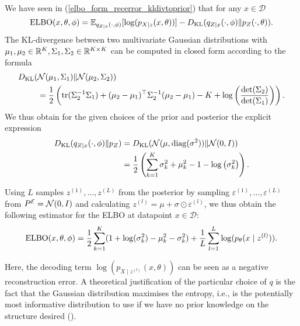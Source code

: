 We have seen in (\ref{elbo_form_recerror_kldivtoprior}) that for any $x \in \mathcal{D}$
$$
	\elbo(x,\theta, \phi) = \E_{q_{Z\mid x}(\cdot, \phi)}[\log(p_{X\mid z}(x,\theta))] - \dkl(q_{Z\mid x}(\cdot, \phi) \Vert p_{Z}(\cdot,\theta)).
$$
The KL-divergence between two multivariate Gaussian distributions with $\mu_1,\mu_2 \in \R^K, \Sigma_1, \Sigma_2 \in \R^{K\times K}$ can be computed in closed form according to the formula
\begin{equation}\label{formula_explicit_KL}
\begin{split}
	\dkl(&\mathcal{N}(\mu_1,\Sigma_1)\Vert \mathcal{N}(\mu_2,\Sigma_2)) \\
	&= \frac{1}{2} \left(\mathrm{tr}(\Sigma_2^{-1}\Sigma_1) 
	+ (\mu_2 - \mu_1)^{\top}\Sigma_2^{-1}(\mu_2 - \mu_1) 
	- K 
	+ \log\left(\frac{\det(\Sigma_2)}{\det(\Sigma_1)}\right)\right).
\end{split}
\end{equation}
We thus obtain for the given choices of the prior and posterior the explicit expression
\begin{equation}
\begin{split}
	\dkl(q_{Z\mid x}(\cdot, \phi) \Vert p_Z)
	&= \dkl(\mathcal{N}(\mu,\mathrm{diag}(\sigma^2))\Vert \mathcal{N}(0,I)) \\
	&= \frac{1}{2}\left(\sum_{k=1}^K \sigma_k^2 + \mu_k^2 - 1 - \log\left(\sigma_k^2\right)\right).
\end{split}
\end{equation}

Using $L$ samples $z^{(1)}, \dots, z^{(L)}$ from the posterior by sampling $\varepsilon^{(1)}, \dots, \varepsilon^{(L)}$ from $\P^{\mathcal{E}} = \mathcal{N}(0,I)$ and calculating $z^{(l)} = \mu + \sigma \odot \varepsilon^{(l)}$, we thus obtain the following estimator for the ELBO at datapoint $x\in \mathcal{D}$:
\begin{equation}
	\elbo(x, \theta, \phi) = \frac{1}{2} \sum_{k=1}^{K}(1+\log(\sigma_k^2) - \mu_k^2 - \sigma_k^2) + \frac{1}{L}\sum_{l=1}^{L} \log(p_{\theta}(x\mid z^{(l)})).
\end{equation}

Here, the decoding term $\log(p_{X\mid z^{(l)}}(x,\theta))$ can be seen as a negative reconstruction error.
A theoretical justification of the particular choice of $q$ is the fact that the Gaussian distribution maximises the entropy, i.e., is the potentially most informative distribution to use if we have no prior knowledge on the structure desired (\cite[pp.~644f.]{Goodfellow2016}).

